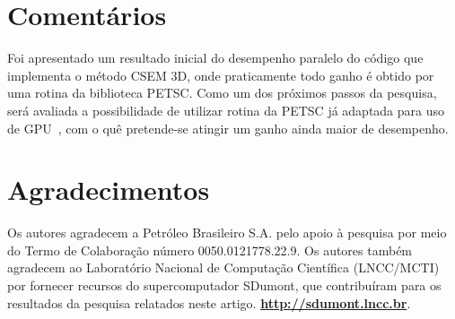 \documentclass[12pt]{article}
\begin{document}
\section{Comentários}
Foi apresentado um resultado inicial do desempenho paralelo do código que implementa o método CSEM 3D, onde praticamente todo ganho é obtido por uma rotina da biblioteca PETSC. Como um dos próximos passos da pesquisa, será avaliada a possibilidade de utilizar rotina da PETSC já adaptada para uso de GPU~\cite{MILLS2021}, com o quê pretende-se atingir um ganho ainda maior de desempenho.

\section*{Agradecimentos}
Os autores agradecem a Petróleo Brasileiro S.A. pelo apoio à pesquisa por meio do Termo de Colaboração número 0050.0121778.22.9. Os autores também agradecem ao Laboratório Nacional de Computação Científica (LNCC/MCTI) por fornecer recursos do supercomputador SDumont, que contribuíram para os resultados da pesquisa relatados neste artigo. \textbf{\url{http://sdumont.lncc.br}}.



\end{document}
